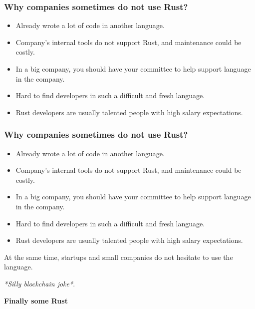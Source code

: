 \documentclass[aspectratio=1610,t]{beamer}
\begin{document}

\begin{frame}
\frametitle{Why companies sometimes do \textbf{not} use Rust?}

\begin{itemize}
    \item Already wrote a lot of code in another language.
    \item Company's internal tools do not support Rust, and maintenance could be costly.
    \item In a big company, you should have your committee to help support language in the company. 
    \item Hard to find developers in such a difficult and fresh language.
    \item Rust developers are usually talented people with high salary expectations.
\end{itemize}
\end{frame}


\begin{frame}
\frametitle{Why companies sometimes do \textbf{not} use Rust?}

\begin{itemize}
    \item Already wrote a lot of code in another language.
    \item Company's internal tools do not support Rust, and maintenance could be costly.
    \item In a big company, you should have your committee to help support language in the company. 
    \item Hard to find developers in such a difficult and fresh language.
    \item Rust developers are usually talented people with high salary expectations.
\end{itemize}

At the same time, startups and small companies do not hesitate to use the language.

\textit{*Silly blockchain joke*}.
\end{frame}


\begin{frame}[c]
\centering\Huge\textbf{Finally some Rust}
\end{frame}
\end{document}
